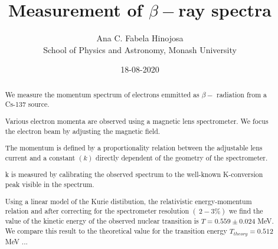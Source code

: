 \documentclass{article}
\title{Measurement of $\beta-$ray spectra}
\author{Ana C. Fabela Hinojosa\\
\small{School of Physics and Astronomy, Monash University}}
\begin{document}
\maketitle
\date{18-08-2020}
\begin{abstract}
We measure the momentum spectrum of electrons emmitted as $\beta-$ radiation from a Cs-137 source. 

Various electron momenta are observed using a magnetic lens spectrometer.
We focus the electron beam by adjusting the magnetic field. 

 The momentum is defined by a proportionality relation between the adjustable lens current and a constant $(k)$ directly dependent of the geometry of the spectrometer.

 k is measured by calibrating the observed spectrum to the well-known K-conversion peak visible in the spectrum. 

 Using a linear model of the Kurie distibution, the relativistic energy-momentum relation and after correcting for the spectrometer resolution $(~2-3\%)$ we find the value of the kinetic energy of the observed nuclear transition is $T = 0.559 \pm 0.024$ MeV. We compare this result to the theoretical value for the transition energy $T_{theory} = 0.512$ MeV  ... 
\end{abstract}
\end{document}
